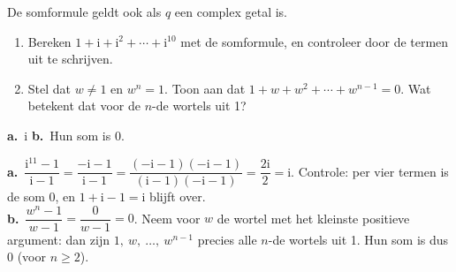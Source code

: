\begin{oefeningen}
\begin{oefening}[2]
 De somformule geldt ook als $q$ een complex getal is.
\begin{enumerate}
  \item Bereken $1 + \mathrm{i} + \mathrm{i}^2 + \cdots + \mathrm{i}^{10}$ met de somformule, en controleer door de termen uit te schrijven.
  \item Stel dat $w \neq 1$ en $w^n = 1$. Toon aan dat $1 + w + w^2 + \cdots + w^{n-1} = 0$. Wat betekent dat voor de $n$-de wortels uit 1?
\end{enumerate}
\begin{solution}
\textbf{a.}~$\mathrm{i}$ \quad \textbf{b.}~Hun som is 0.
\end{solution}
\begin{fullsolution}
\textbf{a.}~$\dfrac{\mathrm{i}^{11}-1}{\mathrm{i}-1}=\dfrac{-\mathrm{i}-1}{\mathrm{i}-1}=\dfrac{(-\mathrm{i}-1)(-\mathrm{i}-1)}{(\mathrm{i}-1)(-\mathrm{i}-1)}=\dfrac{2\mathrm{i}}{2}=\mathrm{i}$. Controle: per vier termen is de som 0, en $1+\mathrm{i}-1=\mathrm{i}$ blijft over.\\
\textbf{b.}~$\dfrac{w^n-1}{w-1}=\dfrac{0}{w-1}=0$. Neem voor $w$ de wortel met het kleinste positieve argument: dan zijn $1,\ w,\ \ldots,\ w^{n-1}$ precies alle $n$-de wortels uit 1. Hun som is dus 0 (voor $n\geqslant 2$).
\end{fullsolution}
\end{oefening}


\end{oefeningen}
